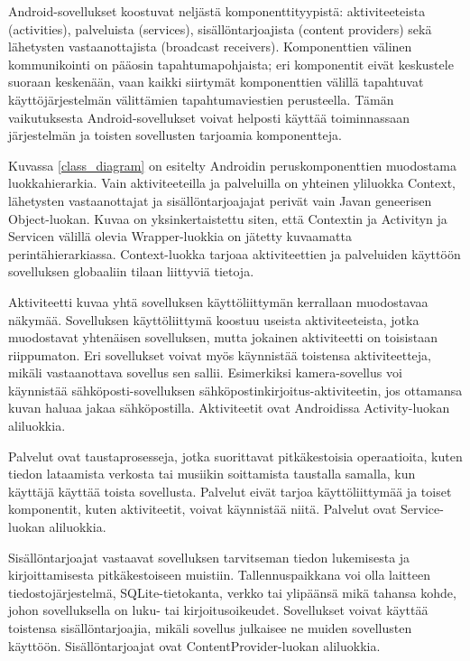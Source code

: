 Android-sovellukset koostuvat neljästä komponenttityypistä: aktiviteeteista (activities), palveluista (services), sisällöntarjoajista (content providers) sekä lähetysten vastaanottajista (broadcast receivers). Komponenttien välinen kommunikointi on pääosin tapahtumapohjaista; eri komponentit eivät keskustele suoraan keskenään, vaan kaikki siirtymät komponenttien välillä tapahtuvat käyttöjärjestelmän välittämien tapahtumaviestien perusteella. Tämän vaikutuksesta Android-sovellukset voivat helposti käyttää toiminnassaan järjestelmän ja toisten sovellusten tarjoamia komponentteja.

Kuvassa \ref{class_diagram} on esitelty Androidin peruskomponenttien muodostama luokkahierarkia. Vain aktiviteeteilla ja palveluilla on yhteinen yliluokka Context, lähetysten vastaanottajat ja sisällöntarjoajajat perivät vain Javan geneerisen Object-luokan. Kuvaa on yksinkertaistettu siten, että Contextin ja Activityn ja Servicen välillä olevia Wrapper-luokkia on jätetty kuvaamatta perintähierarkiassa. Context-luokka tarjoaa aktiviteettien ja palveluiden käyttöön sovelluksen globaaliin tilaan liittyviä tietoja.

Aktiviteetti kuvaa yhtä sovelluksen käyttöliittymän kerrallaan muodostavaa näkymää. Sovelluksen käyttöliittymä koostuu useista aktiviteeteista, jotka muodostavat yhtenäisen sovelluksen, mutta jokainen aktiviteetti on toisistaan riippumaton. Eri sovellukset voivat myös käynnistää toistensa aktiviteetteja, mikäli vastaanottava sovellus sen sallii. Esimerkiksi kamera-sovellus voi käynnistää sähköposti-sovelluksen sähköpostinkirjoitus-aktiviteetin, jos ottamansa kuvan haluaa jakaa sähköpostilla. Aktiviteetit ovat Androidissa Activity-luokan aliluokkia.

Palvelut ovat taustaprosesseja, jotka suorittavat pitkäkestoisia operaatioita, kuten tiedon lataamista verkosta tai musiikin soittamista taustalla samalla, kun käyttäjä käyttää toista sovellusta. Palvelut eivät tarjoa käyttöliittymää ja toiset komponentit, kuten aktiviteetit, voivat käynnistää niitä. Palvelut ovat Service-luokan aliluokkia.

Sisällöntarjoajat vastaavat sovelluksen tarvitseman tiedon lukemisesta ja kirjoittamisesta pitkäkestoiseen muistiin. Tallennuspaikkana voi olla laitteen tiedostojärjestelmä, SQLite-tietokanta, verkko tai ylipäänsä mikä tahansa kohde, johon sovelluksella on luku- tai kirjoitusoikeudet. Sovellukset voivat käyttää toistensa sisällöntarjoajia, mikäli sovellus julkaisee ne muiden sovellusten käyttöön. Sisällöntarjoajat ovat ContentProvider-luokan aliluokkia.

